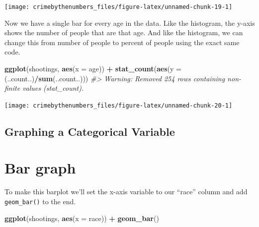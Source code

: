\documentclass[
  12pt,
]{book}
\newenvironment{Shaded}{\begin{snugshade}}{\end{snugshade}}
\newcommand{\CommentTok}[1]{\textcolor[rgb]{0.37,0.37,0.37}{\textit{#1}}}
\newcommand{\DataTypeTok}[1]{\textcolor[rgb]{0.27,0.27,0.27}{#1}}
\newcommand{\KeywordTok}[1]{\textcolor[rgb]{0.27,0.27,0.27}{\textbf{#1}}}
\newcommand{\NormalTok}[1]{#1}
\newcommand{\OperatorTok}[1]{\textcolor[rgb]{0.43,0.43,0.43}{\textbf{#1}}}
\newcommand{\StringTok}[1]{\textcolor[rgb]{0.5,0.5,0.5}{#1}}
\begin{document}
\begin{center}\texttt{[image: crimebythenumbers\_files/figure-latex/unnamed-chunk-19-1]} \end{center}

Now we have a single bar for every age in the data. Like the histogram, the y-axis shows the number of people that are that age. And like the histogram, we can change this from number of people to percent of people using the exact same code.

\begin{Shaded}
\begin{Highlighting}[]
\KeywordTok{ggplot}\NormalTok{(shootings, }\KeywordTok{aes}\NormalTok{(}\DataTypeTok{x =}\NormalTok{ age)) }\OperatorTok{+}\StringTok{ }
\StringTok{  }\KeywordTok{stat\_count}\NormalTok{(}\KeywordTok{aes}\NormalTok{(}\DataTypeTok{y =}\NormalTok{ (..count..)}\OperatorTok{/}\KeywordTok{sum}\NormalTok{(..count..)))}
\CommentTok{\#\textgreater{} Warning: Removed 254 rows containing non{-}finite values (stat\_count).}
\end{Highlighting}
\end{Shaded}

\begin{center}\texttt{[image: crimebythenumbers\_files/figure-latex/unnamed-chunk-20-1]} \end{center}

\hypertarget{graphing-a-categorical-variable}{%
\subsection{Graphing a Categorical Variable}\label{graphing-a-categorical-variable}}

\hypertarget{bar-graph}{%
\section{Bar graph}\label{bar-graph}}

To make this barplot we'll set the x-axis variable to our ``race'' column and add \texttt{geom\_bar()} to the end.

\begin{Shaded}
\begin{Highlighting}[]
\KeywordTok{ggplot}\NormalTok{(shootings, }\KeywordTok{aes}\NormalTok{(}\DataTypeTok{x =}\NormalTok{ race)) }\OperatorTok{+}\StringTok{ }
\StringTok{  }\KeywordTok{geom\_bar}\NormalTok{()}
\end{Highlighting}
\end{Shaded}
\end{document}
